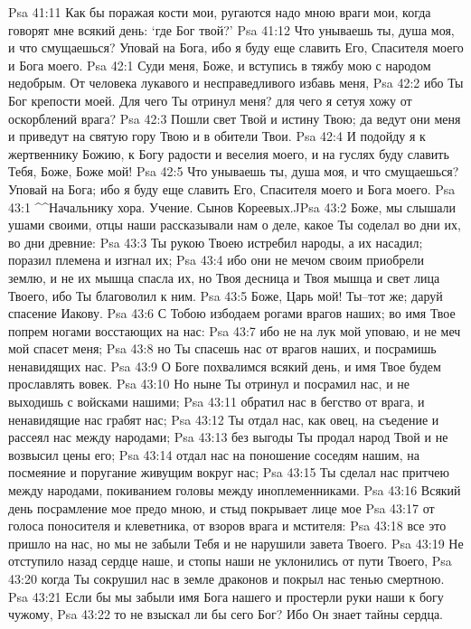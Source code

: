 Psa 41:11  Как бы поражая кости мои, ругаются надо мною враги мои, когда говорят мне всякий день: `где Бог твой?'
Psa 41:12  Что унываешь ты, душа моя, и что смущаешься? Уповай на Бога, ибо я буду еще славить Его, Спасителя моего и Бога моего.
Psa 42:1  Суди меня, Боже, и вступись в тяжбу мою с народом недобрым. От человека лукавого и несправедливого избавь меня,
Psa 42:2  ибо Ты Бог крепости моей. Для чего Ты отринул меня? для чего я сетуя хожу от оскорблений врага?
Psa 42:3  Пошли свет Твой и истину Твою; да ведут они меня и приведут на святую гору Твою и в обители Твои.
Psa 42:4  И подойду я к жертвеннику Божию, к Богу радости и веселия моего, и на гуслях буду славить Тебя, Боже, Боже мой!
Psa 42:5  Что унываешь ты, душа моя, и что смущаешься? Уповай на Бога; ибо я буду еще славить Его, Спасителя моего и Бога моего.
Psa 43:1  ^^Начальнику хора. Учение. Сынов Кореевых.^^
Psa 43:2  Боже, мы слышали ушами своими, отцы наши рассказывали нам о деле, какое Ты соделал во дни их, во дни древние:
Psa 43:3  Ты рукою Твоею истребил народы, а их насадил; поразил племена и изгнал их;
Psa 43:4  ибо они не мечом своим приобрели землю, и не их мышца спасла их, но Твоя десница и Твоя мышца и свет лица Твоего, ибо Ты благоволил к ним.
Psa 43:5  Боже, Царь мой! Ты--тот же; даруй спасение Иакову.
Psa 43:6  С Тобою избодаем рогами врагов наших; во имя Твое попрем ногами восстающих на нас:
Psa 43:7  ибо не на лук мой уповаю, и не меч мой спасет меня;
Psa 43:8  но Ты спасешь нас от врагов наших, и посрамишь ненавидящих нас.
Psa 43:9  О Боге похвалимся всякий день, и имя Твое будем прославлять вовек.
Psa 43:10  Но ныне Ты отринул и посрамил нас, и не выходишь с войсками нашими;
Psa 43:11  обратил нас в бегство от врага, и ненавидящие нас грабят нас;
Psa 43:12  Ты отдал нас, как овец, на съедение и рассеял нас между народами;
Psa 43:13  без выгоды Ты продал народ Твой и не возвысил цены его;
Psa 43:14  отдал нас на поношение соседям нашим, на посмеяние и поругание живущим вокруг нас;
Psa 43:15  Ты сделал нас притчею между народами, покиванием головы между иноплеменниками.
Psa 43:16  Всякий день посрамление мое предо мною, и стыд покрывает лице мое
Psa 43:17  от голоса поносителя и клеветника, от взоров врага и мстителя:
Psa 43:18  все это пришло на нас, но мы не забыли Тебя и не нарушили завета Твоего.
Psa 43:19  Не отступило назад сердце наше, и стопы наши не уклонились от пути Твоего,
Psa 43:20  когда Ты сокрушил нас в земле драконов и покрыл нас тенью смертною.
Psa 43:21  Если бы мы забыли имя Бога нашего и простерли руки наши к богу чужому,
Psa 43:22  то не взыскал ли бы сего Бог? Ибо Он знает тайны сердца.
